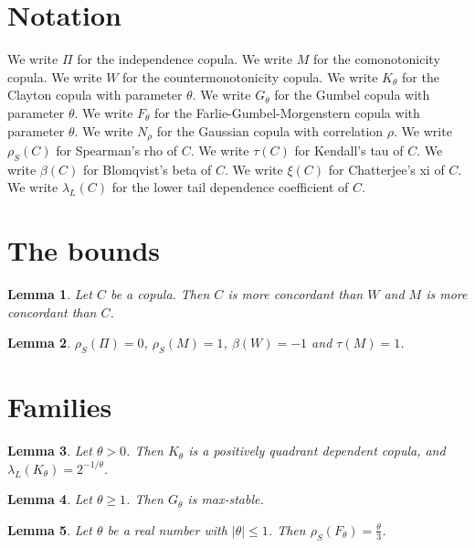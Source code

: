 \documentclass{article}
\newtheorem{lemma}{Lemma}
\begin{document}
\section{Notation}

We write $\Pi$ for the independence copula.
We write $M$ for the comonotonicity copula.
We write $W$ for the countermonotonicity copula.
We write $K_\theta$ for the Clayton copula with parameter $\theta$.
We write $G_\theta$ for the Gumbel copula with parameter $\theta$.
We write $F_\theta$ for the Farlie-Gumbel-Morgenstern copula with parameter $\theta$.
We write $N_\rho$ for the Gaussian copula with correlation $\rho$.
We write $\rho_S(C)$ for Spearman's rho of $C$.
We write $\tau(C)$ for Kendall's tau of $C$.
We write $\beta(C)$ for Blomqvist's beta of $C$.
We write $\xi(C)$ for Chatterjee's xi of $C$.
We write $\lambda_L(C)$ for the lower tail dependence coefficient of $C$.

\section{The bounds}

\begin{lemma}\label{bounds}
Let $C$ be a copula. Then $C$ is more concordant than $W$ and $M$ is more concordant than $C$.
\end{lemma}

\begin{lemma}\label{values}
$\rho_S(\Pi)=0$, $\rho_S(M)=1$, $\beta(W)=-1$ and $\tau(M)=1$.
\end{lemma}

\section{Families}

\begin{lemma}\label{clayton}
Let $\theta>0$. Then $K_\theta$ is a positively quadrant dependent copula, and $\lambda_L(K_\theta)=2^{-1/\theta}$.
\end{lemma}

\begin{lemma}\label{gumbel}
Let $\theta\ge1$. Then $G_\theta$ is max-stable.
\end{lemma}

\begin{lemma}\label{fgm}
Let $\theta$ be a real number with $|\theta|\le1$. Then $\rho_S(F_\theta)=\frac{\theta}{3}$.
\end{lemma}
\end{document}
